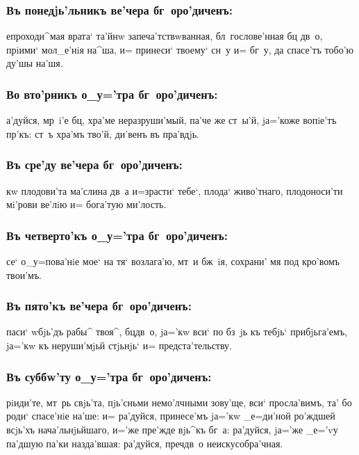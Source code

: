 \documentclass[14pt,twoside]{extreport}
\renewcommand{\*}{~~\raise3pt\hbox{\footnotesize*}}
\begin{document}
\subsubsection{Въ понедjь'льникъ ве'чера бг~оро'диченъ:}

епроходи^мая врата` та'йнw за\-пе\-ча'т\-ст\-вw\-ван\-ная, бл~го\-сло\-ве'н\-ная бц
дв~о, прiими` мол_е'нiя на^ша, и= принеси` твоему` сн~у и= бг~у, да спасе'тъ
тобо'ю ду'шы на'шя.

\subsubsection{Во вто'рникъ о_у='тра бг~оро'диченъ:}

а'дуйся, мр~i'е бц, хра'ме неразруши'мый, па'че же ст~ы'й, jа='коже
вопiе'тъ пр'къ: ст~ъ хра'мъ тво'й, ди'венъ въ пра'вдjь.

\subsubsection{Въ сре'ду ве'чера бг~оро'диченъ:}

кw плодови'та ма'слина дв~а и=зрасти` тебе`, плода` живо'тнаго,
плодоноси'ти мi'рови ве'лiю и= бога'тую ми'лость.

\subsubsection{Въ четверто'къ о_у='тра бг~оро'диченъ:}

се` о_у=пова'нiе мое` на тя` возлага'ю, мт~и бж~iя, сохрани' мя под\ъ
кро'вомъ твои'мъ.

\subsubsection{Въ пято'къ ве'чера бг~оро'диченъ:}

паси` w\т бjь'дъ рабы^ твоя^, бц дв~о, jа='кw вси` по бз~jь къ
тебjь` прибjьга'емъ, jа='кw къ неруши'мjьй стjьнjь` и= предста'тельству.

\subsubsection{Въ суббw'ту о_у='тра бг~оро'диченъ:}

рiиди'те, мт~рь свjь'та, пjь'сньми немо'лчными зову'ще, вси`
просла'вимъ, та' бо роди` спасе'нiе на'ше: и= ра'дуйся, принесе'мъ jа='кw
_е=ди'ной ро'ждшей всjь'хъ нача'льнjьйшаго, и='же пре'жде вjь^къ бг~а:
ра'дуйся, jа='же _е='vу па'дшую па'ки назда'вшая: ра'дуйся, пре\-ч дв~о
неискусобра'чная.
\end{document}
